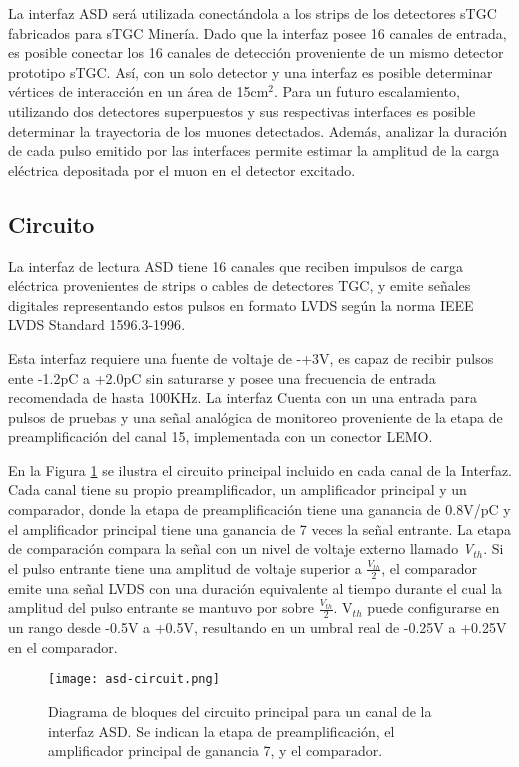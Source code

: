 La interfaz ASD será utilizada conectándola a los strips de los detectores sTGC fabricados para sTGC Minería. Dado que la interfaz posee 16 canales de entrada, es posible conectar los 16 canales de detección proveniente de un mismo detector prototipo sTGC. Así, con un solo detector y una interfaz es posible determinar vértices de interacción en un área de 15cm$^2$. Para un futuro escalamiento, utilizando dos detectores superpuestos y sus respectivas interfaces es posible determinar la trayectoria de los muones detectados. Además, analizar la duración de cada pulso emitido por las interfaces permite estimar la amplitud de la carga eléctrica depositada por el muon en el detector excitado.


\subsection{Circuito}
La interfaz de lectura ASD tiene 16 canales que reciben impulsos de carga eléctrica provenientes de strips o cables de detectores TGC, y emite señales digitales representando estos pulsos en formato LVDS según la norma IEEE LVDS Standard 1596.3-1996\cite{1996IEEESociety}.

Esta interfaz requiere una fuente de voltaje de -+3V\cite{1999ATLASICs}, es capaz de recibir pulsos ente -1.2pC a +2.0pC sin saturarse y posee una frecuencia de entrada recomendada de hasta 100KHz. La interfaz Cuenta con un una entrada para pulsos de pruebas y una señal analógica de monitoreo proveniente de la etapa de preamplificación del canal 15, implementada con un conector LEMO.

En la Figura \ref{img:asd-circuit} se ilustra el circuito principal incluido en cada canal de la Interfaz. Cada canal tiene su propio preamplificador, un amplificador principal y un comparador\cite{1999ATLASICs}, donde la etapa de preamplificación tiene una ganancia de 0.8V/pC y el amplificador principal tiene una ganancia de 7 veces la señal entrante. La etapa de comparación compara la señal con un nivel de voltaje externo llamado \textit{V$_{th}$}. Si el pulso entrante tiene una amplitud de voltaje superior a $\frac{V_{th}}{2}$, el comparador emite una señal LVDS con una duración equivalente al tiempo durante el cual la amplitud del pulso entrante se mantuvo por sobre $\frac{V_{th}}{2}$. V$_{th}$ puede configurarse en un rango desde -0.5V a +0.5V, resultando en un umbral real de -0.25V a +0.25V en el comparador\cite{1999ATLASICs}.

\begin{figure}[h]
	\centering
	\texttt{[image: asd-circuit.png]}
	\caption{Diagrama de bloques del circuito principal para un canal de la interfaz ASD. Se indican la etapa de preamplificación, el amplificador principal de ganancia 7, y el comparador.}
	\label{img:asd-circuit}
\end{figure}

